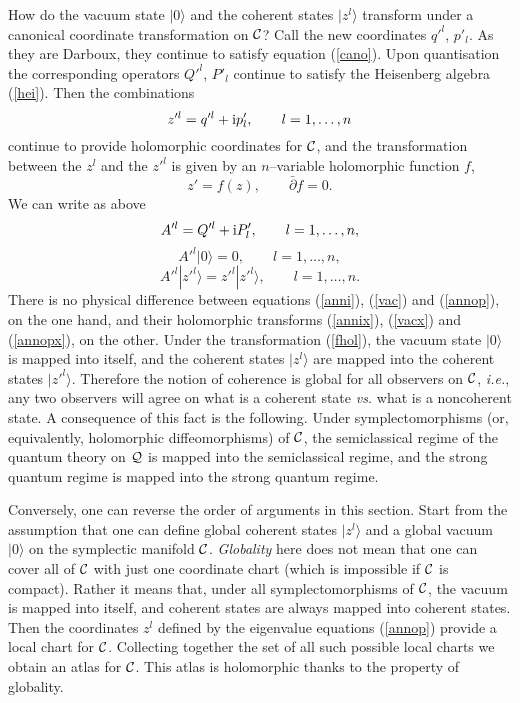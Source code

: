 \documentclass[a4paper,a4paper]{article}
\begin{document}
How do the vacuum state $|0\rangle$ and the coherent states $|z^l\rangle$
transform under a canonical coordinate transformation on ${\cal C}$? 
Call the new coordinates $q'^l$, $p'_l$. As they  are Darboux, they continue 
to satisfy equation (\ref{cano}). Upon quantisation the 
corresponding operators $Q'^l$, $P'_l$ continue to satisfy the Heisenberg 
algebra (\ref{hei}). Then the combinations
\begin{equation}
z'^l=q'^l + {\rm i} p'_l,  \qquad l=1,\ldots, n
\label{xcompcoords}
\end{equation}
continue to provide holomorphic coordinates for ${\cal C}$, and the 
transformation between the $z^l$ and the $z'^l$ is given by an $n$--variable
holomorphic function $f$,
\begin{equation}
z'=f(z),\qquad \bar\partial f=0.
\label{fhol}
\end{equation}
We can write as above
\begin{equation}
A'^l=Q'^l+{\rm i} P'_l,\qquad l=1,\ldots, n,
\label{annix}
\end{equation}
\begin{equation}
A'^l|0\rangle = 0,  \qquad l=1, \ldots, n,
\label{vacx}
\end{equation}
\begin{equation}
A'^l|z'^l\rangle=z'^l|z'^l\rangle,\qquad l=1,\ldots, n.
\label{annopx}
\end{equation}
There is no physical difference between equations (\ref{anni}), (\ref{vac}) and 
(\ref{annop}), on the one hand, and their holomorphic transforms (\ref{annix}), 
(\ref{vacx}) and (\ref{annopx}), on the other. Under the transformation 
(\ref{fhol}), the vacuum state $|0\rangle$ is mapped into itself, 
and the coherent states $|z^l\rangle$ are mapped into the coherent states $|z'^l\rangle$.
Therefore the notion of coherence is global for all observers on ${\cal 
C}$, {\it i.e.}, any two observers will agree on what is a coherent 
state {\it vs.} what is a noncoherent state. A consequence of 
this fact is the following. Under symplectomorphisms (or, equivalently, 
holomorphic diffeomorphisms) of ${\cal C}$, the semiclassical regime 
of the quantum theory on ${\cal Q}$ is mapped into the semiclassical regime, 
and the strong quantum regime is mapped into the strong quantum regime.

Conversely, one can reverse the order of arguments in this section. 
Start from the assumption that one can define global coherent states 
$|z^l\rangle$ and a global vacuum $|0\rangle$ on the symplectic manifold ${\cal C}$.
{\it Globality}\/ here does not mean that one can cover all of ${\cal C}$ 
with just one coordinate chart (which is impossible if ${\cal C}$ is compact).
Rather it means that, under all
symplectomorphisms of ${\cal C}$, the vacuum is mapped into itself, 
and coherent states are always mapped into coherent states. 
Then the coordinates $z^l$ defined by the eigenvalue equations 
(\ref{annop}) provide a local chart for ${\cal C}$. Collecting together the set of all 
such possible local charts we obtain an atlas for ${\cal C}$. This atlas is holomorphic 
thanks to the property of globality.
\end{document}
